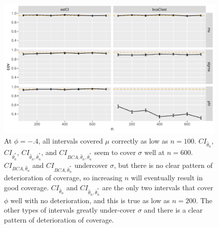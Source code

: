 \documentclass[12pt, letterpaper, titlepage]{article}
\begin{document}
\begin{figure}[tbp]
\caption{}
  \centering
  \includegraphics[width=\textwidth]{figures/plot_n.4}
  \caption{At $\phi = -.4$, all intervals covered $\mu$ correctly as low as $n = 100$. $CI_{\hat{\theta}_{n}}$, $CI_{\bar\theta_n^*}$, $CI_{\hat{\theta}_{n}, \bar\theta_n^*}$, and $CI_{BCA, \hat{\theta}_{n}, \bar\theta_n^*}$ seem to cover $\sigma$ well at $n = 600$. $CI_{BCA, \hat{\theta}_{n}}$ and $CI_{BCA, \bar\theta_n^*}$ undercover $\sigma$, but there is no clear pattern of deterioration of coverage, so increasing $n$ will eventually result in good coverage. $CI_{\hat{\theta}_{n}}$ and $CI_{\hat{\theta}_{n}, \bar\theta_n^*}$ are the only two intervals that cover $\phi$ well with no deterioration, and this is true as low as $n = 200$. The other types of intervals greatly under-cover $\sigma$ and there is a clear pattern of deterioration of coverage.}
  \label{fig:plot_n.4}
\end{figure}
\end{document}
